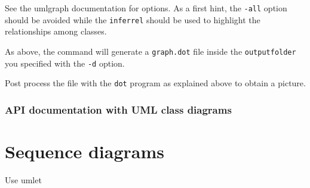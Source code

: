 \documentclass{book}
\begin{document}
See the umlgraph documentation for options. As a first hint, the \verb+-all+ option should be avoided while the \verb+inferrel+ should be used to highlight the relationships among classes. 

As above, the command will generate a \verb+graph.dot+ file inside the \verb+outputfolder+ you specified with the \verb+-d+ option.

Post process the file with the \verb+dot+ program as explained above to obtain a picture.

\subsubsection{API documentation with UML class diagrams}

\section{Sequence diagrams}

Use umlet
\end{document}
